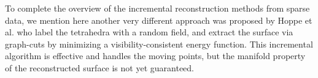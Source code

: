
To complete the overview of the incremental reconstruction methods from sparse data, we mention here another very different approach was proposed by Hoppe et al. \cite{Hoppe13} who label the tetrahedra with a random field, and extract the surface via graph-cuts by minimizing a visibility-consistent energy function. This incremental algorithm is effective and handles the moving points, but the manifold property of the reconstructed surface is not yet guaranteed.




